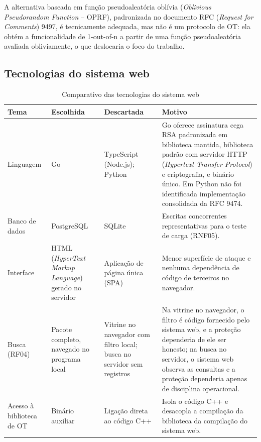 A alternativa baseada em função pseudoaleatória oblívia (\emph{Oblivious Pseudorandom Function} -- OPRF), padronizada no documento RFC (\emph{Request for Comments}) 9497, é tecnicamente adequada, mas não é um protocolo
de OT: ela obtém a funcionalidade de 1-out-of-n a partir de uma função
pseudoaleatória avaliada obliviamente, o que deslocaria o foco do trabalho.


\subsection{Tecnologias do sistema web}

\begin{table}[H]
\centering
\caption{Comparativo das tecnologias do sistema web}\label{tab:comp-stack}
\footnotesize
\renewcommand{\arraystretch}{1.25}
\begin{tabularx}{\textwidth}{@{}>{\raggedright\arraybackslash}p{}
  >{\raggedright\arraybackslash}p{} >{\raggedright\arraybackslash}p{}
  >{\raggedright\arraybackslash}X@{}}
\toprule
\textbf{Tema} & \textbf{Escolhida} & \textbf{Descartada} & \textbf{Motivo} \\
\midrule
Linguagem & Go & TypeScript (Node.js); Python &
Go oferece assinatura cega RSA padronizada \cite{rfc9474} em biblioteca
mantida, biblioteca padrão com servidor HTTP (\emph{Hypertext Transfer Protocol}) e criptografia, e binário único.
Em Python não foi identificada implementação consolidada da RFC 9474. \\
\addlinespace
Banco de dados & PostgreSQL & SQLite &
Escritas concorrentes representativas para o teste de carga (RNF05). \\
\addlinespace
Interface & HTML (\emph{HyperText Markup Language}) gerado no servidor & Aplicação de página única (SPA) &
Menor superfície de ataque e nenhuma dependência de código de terceiros no
navegador. \\
\addlinespace
Busca (RF04) & Pacote completo, navegado no programa local & Vitrine no
navegador com filtro local; busca no servidor sem registros &
Na vitrine no navegador, o filtro é código fornecido pelo sistema web, e a
proteção dependeria de ele ser honesto; na busca no servidor, o sistema web
observa as consultas e a proteção dependeria apenas de disciplina
operacional. \\
\addlinespace
Acesso à biblioteca de OT & Binário auxiliar & Ligação direta ao código C++ &
Isola o código C++ e desacopla a compilação da biblioteca da compilação do
sistema web. \\
\bottomrule
\end{tabularx}
\end{table}


